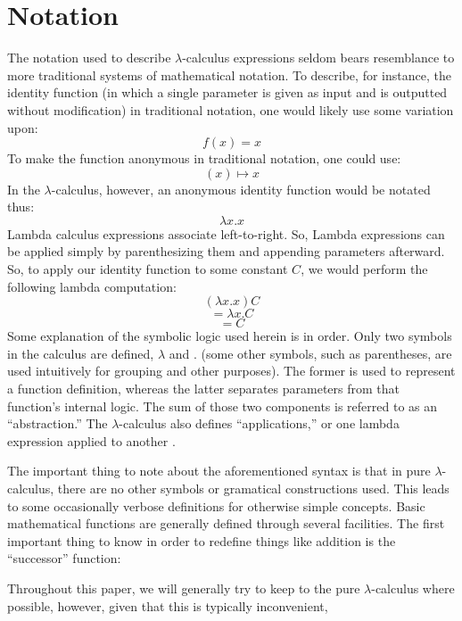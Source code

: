 \documentclass{article}
\begin{document}
\section{Notation}
The notation used to describe $\lambda$-calculus expressions seldom bears resemblance to more traditional systems of mathematical notation. To describe, for instance, the identity function (in which a single parameter is given as input and is outputted without modification) in traditional notation, one would likely use some variation upon:
$$f(x)=x$$
To make the function anonymous in traditional notation, one could use:
$$(x) \mapsto x$$
In the $\lambda$-calculus, however, an anonymous identity function would be notated thus:
$$\lambda x.x$$
Lambda calculus expressions associate left-to-right. So, Lambda expressions can be applied simply by parenthesizing them and appending parameters afterward. So, to apply our identity function to some constant $C$, we would perform the following lambda computation:
$$(\lambda x.x)C$$
$$=\lambda x.C$$
$$=C$$
Some explanation of the symbolic logic used herein is in order. Only two symbols in the calculus are defined, $\lambda$ and $.$ (some other symbols, such as parentheses, are used intuitively for grouping and other purposes). The former is used to represent a function definition, whereas the latter separates parameters from that function's internal logic. The sum of those two components is referred to as an ``abstraction.'' The $\lambda$-calculus also defines ``applications,'' or one lambda expression applied to another \cite{horowitz}.

The important thing to note about the aforementioned syntax is that in pure $\lambda$-calculus, there are no other symbols or gramatical constructions used. This leads to some occasionally verbose definitions for otherwise simple concepts. Basic mathematical functions are generally defined through several facilities. The first important thing to know in order to redefine things like addition is the ``successor'' function:
$$$$


Throughout this paper, we will generally try to keep to the pure $\lambda$-calculus where possible, however, given that this is typically inconvenient,
\end{document}
